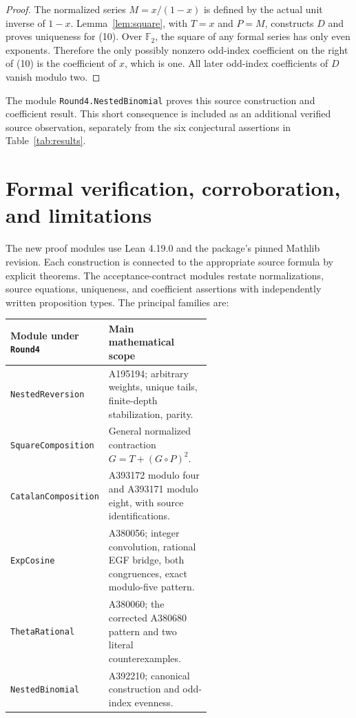 \documentclass[11pt,a4paper]{article}
\theoremstyle{remark}
\newcommand{\F}{\mathbb F}
\begin{document}
\begin{proof}
The normalized series $M=x/(1-x)$ is defined by the actual unit inverse
of $1-x$. Lemma~\ref{lem:square}, with $T=x$ and $P=M$, constructs $D$
and proves uniqueness for (10). Over $\F_2$, the square of any formal
series has only even exponents. Therefore the only possibly nonzero
odd-index coefficient on the right of (10) is the coefficient of $x$,
which is one. All later odd-index coefficients of $D$ vanish modulo two.
\end{proof}

The module \texttt{Round4.NestedBinomial} proves this source construction
and coefficient result. This short consequence is included as an
additional verified source observation, separately from the six
conjectural assertions in Table~\ref{tab:results}.

\section{Formal verification, corroboration, and limitations}

The new proof modules use Lean 4.19.0 and the package's pinned Mathlib
revision. Each construction is connected to the appropriate source
formula by explicit theorems. The acceptance-contract modules restate
normalizations, source equations, uniqueness, and coefficient assertions
with independently written proposition types. The principal families are:

\begin{center}\small
\begin{tabular}{@{}lp{0.58\linewidth}@{}}
\toprule
Module under \texttt{Round4} & Main mathematical scope\\
\midrule
\texttt{NestedReversion} & A195194; arbitrary weights, unique tails, finite-depth stabilization, parity.\\[3pt]
\texttt{SquareComposition} & General normalized contraction $G=T+(G\circ P)^2$.\\[3pt]
\texttt{CatalanComposition} & A393172 modulo four and A393171 modulo eight, with source identifications.\\[3pt]
\texttt{ExpCosine} & A380056; integer convolution, rational EGF bridge, both congruences, exact modulo-five pattern.\\[3pt]
\texttt{ThetaRational} & A380060; the corrected A380680 pattern and two literal counterexamples.\\[3pt]
\texttt{NestedBinomial} & A392210; canonical construction and odd-index evenness.\\
\bottomrule
\end{tabular}
\end{center}
\end{document}
